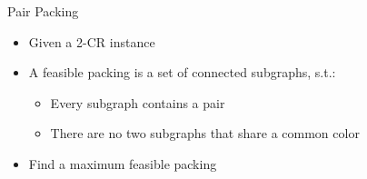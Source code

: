 \begin{frame}{Pair Packing}
\begin{itemize}
\item Given a 2-CR instance
\item A feasible packing is a set of connected subgraphs, s.t.:
	\begin{itemize}
	\item Every subgraph contains a pair
	\item There are no two subgraphs that share a common color 
	\end{itemize} 
\item Find a maximum feasible packing
\end{itemize}

\end{frame}